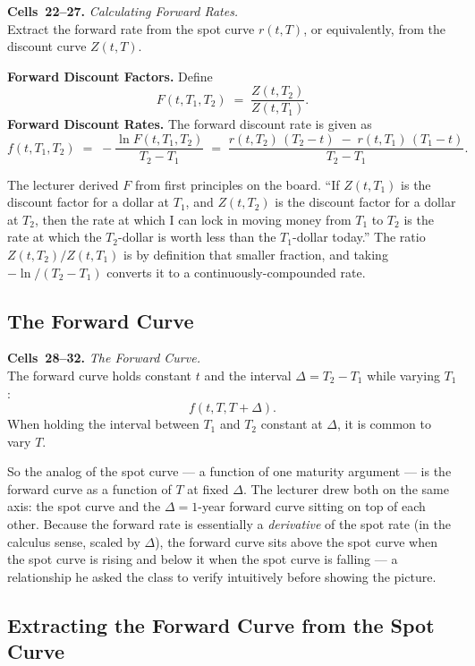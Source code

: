 \begin{keyblock}
\textbf{Cells~22--27.} \emph{Calculating Forward Rates.}\\
Extract the forward rate from the spot curve $r(t,T)$, or equivalently, from
the discount curve $Z(t,T)$.

\textbf{Forward Discount Factors.} Define
\[
    F(t,T_1,T_2) \;=\; \frac{Z(t,T_2)}{Z(t,T_1)}.
\]
\textbf{Forward Discount Rates.} The forward discount rate is given as
\[
    f(t,T_1,T_2) \;=\; -\frac{\ln F(t,T_1,T_2)}{T_2 - T_1}
                    \;=\; \frac{r(t,T_2)\,(T_2-t) \;-\; r(t,T_1)\,(T_1-t)}{T_2 - T_1}.
\]
\end{keyblock}

The lecturer derived $F$ from first principles on the board. ``If
$Z(t,T_1)$ is the discount factor for a dollar at $T_1$, and $Z(t,T_2)$ is
the discount factor for a dollar at $T_2$, then the rate at which I can lock
in moving money from $T_1$ to $T_2$ is the rate at which the $T_2$-dollar is
worth less than the $T_1$-dollar today.'' The ratio
$Z(t,T_2)/Z(t,T_1)$ is by definition that smaller fraction, and taking
$-\ln/(T_2-T_1)$ converts it to a continuously-compounded rate.

\subsection{The Forward Curve}\label{L1-sec:fwd-curve}

\begin{keyblock}
\textbf{Cells~28--32.} \emph{The Forward Curve.}\\
The forward curve holds constant $t$ and the interval $\Delta = T_2 - T_1$
while varying $T_1$:
\[
    f(t, T, T+\Delta).
\]
When holding the interval between $T_1$ and $T_2$ constant at $\Delta$, it is
common to vary $T$.
\end{keyblock}

So the analog of the spot curve --- a function of one maturity argument --- is
the forward curve as a function of $T$ at fixed $\Delta$. The lecturer drew
both on the same axis: the spot curve and the $\Delta=1$-year forward curve
sitting on top of each other. Because the forward rate is essentially a
\emph{derivative} of the spot rate (in the calculus sense, scaled by $\Delta$),
the forward curve sits above the spot curve when the spot curve is rising and
below it when the spot curve is falling --- a relationship he asked the class
to verify intuitively before showing the picture.

\subsection{Extracting the Forward Curve from the Spot Curve}\label{L1-sec:fwd-extract}

